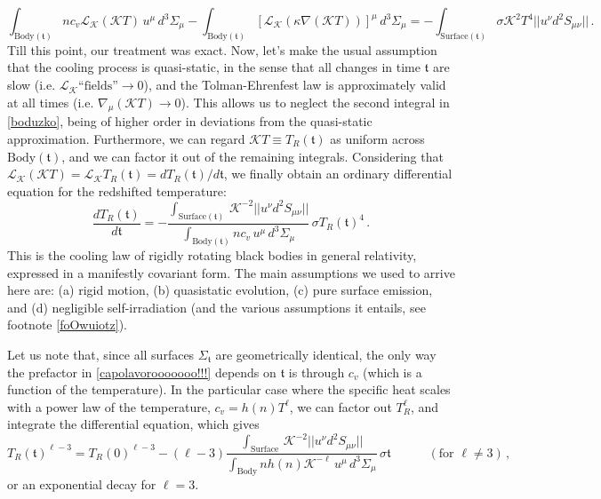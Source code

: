 \documentclass[a4paper, amsfonts, amssymb, amsmath, reprint, showkeys, nofootinbib, twoside, onecolumn,notitlepage]{revtex4-1}
\newcommand{\spc}{\quad \quad \quad}
\newcommand{\K}{{\mathcal{K}}}
\theoremstyle{definition}
\theoremstyle{theorem}
\begin{document}
\begin{equation}\label{boduzko}
\int_{\text{Body}(\mathfrak{t})}  nc_v  \mathcal{L}_\K (\K T) \,  u^\mu \,d^3 \Sigma_\mu-\int_{\text{Body}(\mathfrak{t})}  [\mathcal{L}_\K (\kappa \nabla (\K T))]^\mu \,d^3 \Sigma_\mu =- \int_{\text{Surface}(\mathfrak{t})} \sigma \K^2 T^4 || u^{\nu}  d^2 S_{\mu \nu}|| \, .
\end{equation}
Till this point, our treatment was exact. Now, let's make the usual assumption that the cooling process is quasi-static, in the sense that all changes in time $\mathfrak{t}$ are slow (i.e. $\mathcal{L}_\K \text{``fields''}\rightarrow 0$), and the Tolman-Ehrenfest law is approximately valid at all times (i.e. $\nabla_\mu (\K T)\rightarrow 0$). This allows us to neglect the second integral in \eqref{boduzko}, being of higher order in deviations from the quasi-static approximation. Furthermore, we can regard $\K T\equiv T_R(\mathfrak{t})$ as uniform across $\text{Body}(\mathfrak{t})$, and we can factor it out of the remaining integrals. Considering that $\mathcal{L}_\K(\K T)=\mathcal{L}_\K T_R(\mathfrak{t})=dT_R(\mathfrak{t})/d\mathfrak{t}$, we finally obtain an ordinary differential equation for the redshifted temperature:
%
\begin{equation}
\label{capolavorooooooo!!!}
\boxed{ \dfrac{dT_R(\mathfrak{t})}{d\mathfrak{t}} =- \dfrac{\int_{\text{Surface}(\mathfrak{t})} \, \K^{-2} || u^{\nu}  d^2 S_{\mu \nu}||}{\int_{\text{Body}(\mathfrak{t})}  nc_v  \,  u^\mu \,d^3 \Sigma_\mu} \, \sigma T_R(\mathfrak{t})^4 \,  .}
\end{equation}
%
This is the cooling law of rigidly rotating black bodies in general relativity, expressed in a manifestly covariant form. {\color{black} The main assumptions we used to arrive here are: (a) rigid motion, (b) quasistatic evolution, (c) pure surface emission, and (d) negligible self-irradiation (and the various assumptions it entails, see footnote \ref{foOwuiotz}).}

Let us note that, since all surfaces $\Sigma_{\mathfrak{t}}$ are geometrically identical, the only way the prefactor in \eqref{capolavorooooooo!!!} depends on $\mathfrak{t}$ is through $c_v$ (which is a function of the temperature). In the particular case where the specific heat scales with a power law of the temperature, $c_v=h(n)T^\ell$, we can factor out $T_R^\ell$, and integrate the differential equation, which gives
\begin{equation}
T_R(\mathfrak{t})^{\ell-3}=T_R(0)^{\ell-3} -(\ell{-}3) \dfrac{\int_{\text{Surface}} \, \K^{-2} || u^{\nu}  d^2 S_{\mu \nu}||}{\int_{\text{Body}}  nh(n)\K^{-\ell}  \,  u^\mu \,d^3 \Sigma_\mu} \, \sigma \mathfrak{t} \spc (\text{for }\ell\neq 3) \, ,
\end{equation}
or an exponential decay for $\ell=3$.
\end{document}
